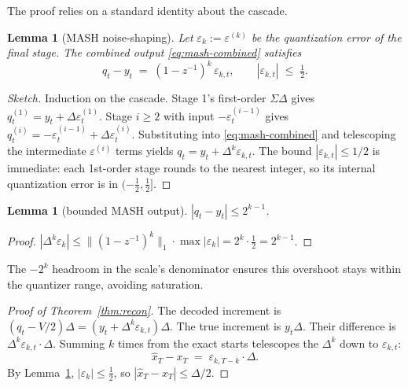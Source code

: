 \documentclass[11pt]{article}
\newtheorem{lemma}[theorem]{Lemma}
\theoremstyle{remark}
\begin{document}
The proof relies on a standard identity about the cascade.

\begin{lemma}[MASH noise-shaping]
\label{lem:mash-bound}
Let $\varepsilon_k := \varepsilon^{(k)}$ be the quantization error of the
final stage. The combined output \eqref{eq:mash-combined} satisfies
\begin{equation}
q_t - y_t \;=\; (1 - z^{-1})^k \, \varepsilon_{k,t}, \qquad
|\varepsilon_{k,t}| \;\le\; \tfrac{1}{2}.
\end{equation}
\end{lemma}

\begin{proof}[Sketch]
Induction on the cascade. Stage 1's first-order $\Sigma\Delta$ gives
$q^{(1)}_t = y_t + \Delta \varepsilon^{(1)}_t$. Stage $i \ge 2$ with
input $-\varepsilon^{(i-1)}_t$ gives $q^{(i)}_t = -\varepsilon^{(i-1)}_t
+ \Delta \varepsilon^{(i)}_t$. Substituting into \eqref{eq:mash-combined}
and telescoping the intermediate $\varepsilon^{(i)}$ terms yields
$q_t = y_t + \Delta^k \varepsilon_{k,t}$. The bound
$|\varepsilon_{k,t}| \le 1/2$ is immediate: each 1st-order stage rounds
to the nearest integer, so its internal quantization error is in
$(-\tfrac{1}{2}, \tfrac{1}{2}]$.
\end{proof}

\begin{lemma}[bounded MASH output]
\label{lem:mash-range}
$|q_t - y_t| \le 2^{k-1}$.
\end{lemma}

\begin{proof}
$|\Delta^k \varepsilon_k| \le \|(1-z^{-1})^k\|_1 \cdot \max|\varepsilon_k|
= 2^k \cdot \tfrac{1}{2} = 2^{k-1}$.
\end{proof}

The $-2^k$ headroom in the scale's denominator ensures this overshoot
stays within the quantizer range, avoiding saturation.

\begin{proof}[Proof of Theorem~\ref{thm:recon}]
The decoded increment is $(q_t - V/2)\Delta = (y_t + \Delta^k
\varepsilon_{k,t})\Delta$. The true increment is $y_t \Delta$. Their
difference is $\Delta^k \varepsilon_{k,t} \cdot \Delta$. Summing $k$
times from the exact starts telescopes the $\Delta^k$ down to
$\varepsilon_{k,t}$:
\begin{equation}
\hat x_T - x_T \;=\; \varepsilon_{k,T-k} \cdot \Delta.
\end{equation}
By Lemma~\ref{lem:mash-bound}, $|\varepsilon_k| \le \tfrac{1}{2}$, so
$|\hat x_T - x_T| \le \Delta/2$.
\end{proof}
\end{document}
